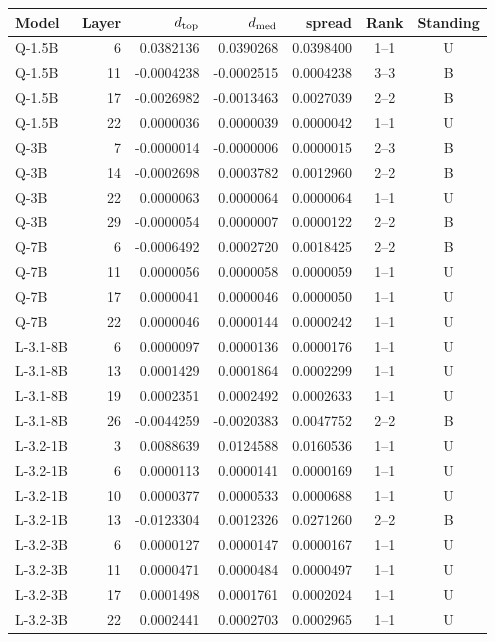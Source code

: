\begin{tabular}{lr rrrcc}
\toprule
Model & Layer & $d_{\rm top}$ & $d_{\rm med}$ & spread & Rank & Standing \\
\midrule
Q-1.5B & 6 & 0.0382136 & 0.0390268 & 0.0398400 & 1--1 & U \\
Q-1.5B & 11 & -0.0004238 & -0.0002515 & 0.0004238 & 3--3 & B \\
Q-1.5B & 17 & -0.0026982 & -0.0013463 & 0.0027039 & 2--2 & B \\
Q-1.5B & 22 & 0.0000036 & 0.0000039 & 0.0000042 & 1--1 & U \\
Q-3B & 7 & -0.0000014 & -0.0000006 & 0.0000015 & 2--3 & B \\
Q-3B & 14 & -0.0002698 & 0.0003782 & 0.0012960 & 2--2 & B \\
Q-3B & 22 & 0.0000063 & 0.0000064 & 0.0000064 & 1--1 & U \\
Q-3B & 29 & -0.0000054 & 0.0000007 & 0.0000122 & 2--2 & B \\
Q-7B & 6 & -0.0006492 & 0.0002720 & 0.0018425 & 2--2 & B \\
Q-7B & 11 & 0.0000056 & 0.0000058 & 0.0000059 & 1--1 & U \\
Q-7B & 17 & 0.0000041 & 0.0000046 & 0.0000050 & 1--1 & U \\
Q-7B & 22 & 0.0000046 & 0.0000144 & 0.0000242 & 1--1 & U \\
L-3.1-8B & 6 & 0.0000097 & 0.0000136 & 0.0000176 & 1--1 & U \\
L-3.1-8B & 13 & 0.0001429 & 0.0001864 & 0.0002299 & 1--1 & U \\
L-3.1-8B & 19 & 0.0002351 & 0.0002492 & 0.0002633 & 1--1 & U \\
L-3.1-8B & 26 & -0.0044259 & -0.0020383 & 0.0047752 & 2--2 & B \\
L-3.2-1B & 3 & 0.0088639 & 0.0124588 & 0.0160536 & 1--1 & U \\
L-3.2-1B & 6 & 0.0000113 & 0.0000141 & 0.0000169 & 1--1 & U \\
L-3.2-1B & 10 & 0.0000377 & 0.0000533 & 0.0000688 & 1--1 & U \\
L-3.2-1B & 13 & -0.0123304 & 0.0012326 & 0.0271260 & 2--2 & B \\
L-3.2-3B & 6 & 0.0000127 & 0.0000147 & 0.0000167 & 1--1 & U \\
L-3.2-3B & 11 & 0.0000471 & 0.0000484 & 0.0000497 & 1--1 & U \\
L-3.2-3B & 17 & 0.0001498 & 0.0001761 & 0.0002024 & 1--1 & U \\
L-3.2-3B & 22 & 0.0002441 & 0.0002703 & 0.0002965 & 1--1 & U \\
\bottomrule
\end{tabular}
